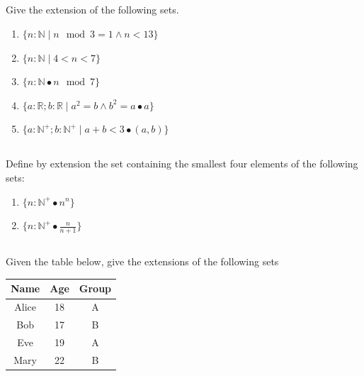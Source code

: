 \documentclass[twocolumn]{article}
\begin{document}
\subsection{}

    Give the extension of the following sets.

    \begin{enumerate}
        \item $\{ n : \mathbb{N} \mid n \mod 3 = 1 \wedge n < 13 \} $
        \item $\{ n : \mathbb{N} \mid 4 < n < 7 \} $
        \item $ \{ n : \mathbb{N} \bullet n \mod 7 \} $
        \item $\{ a : \mathbb{R}; b : \mathbb{R}  \mid a^2 = b \wedge b^2 = a \bullet a \} $
        \item $\{ a : \mathbb{N}^+; b : \mathbb{N}^+  \mid a + b < 3 \bullet (a, b) \} $
    \end{enumerate}


\subsection{}

    Define by extension the set containing the smallest four elements of the following sets:

    \begin{enumerate}
        \item $ \{ n : \mathbb{N}^+ \bullet n^n \} $
        \item $ \{ n : \mathbb{N}^+ \bullet \frac{n}{n+1} \} $
    \end{enumerate}

\subsection{}

    Given the table below, give the extensions of the following sets

    \begin{table}[h!]
        \centering
        \begin{tabular}{c | c | c }
            \toprule
            Name & Age & Group \\
            \midrule
            Alice & 18 & A  \\
            Bob & 17 & B  \\
            Eve & 19 & A \\
            Mary & 22 & B \\
            \bottomrule
        \end{tabular}
    \end{table}
\end{document}
